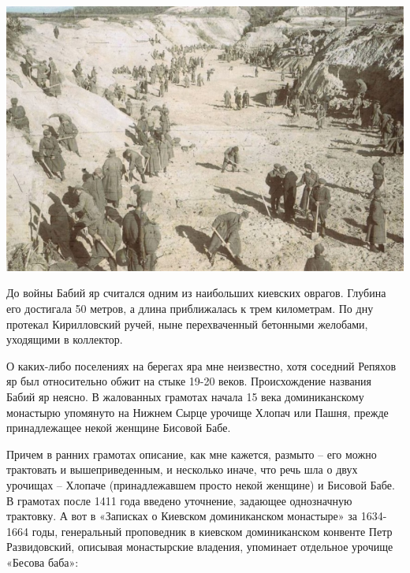 \begin{center}
\includegraphics[width=\linewidth]{chast-zmiy/kurilo/byar-02.jpg}
\end{center}

До войны Бабий яр считался одним из наибольших киевских оврагов. Глубина его достигала 50 метров, а длина приближалась к трем километрам. По дну протекал Кирилловский ручей, ныне перехваченный бетонными желобами, уходящими в коллектор.

О каких-либо поселениях на берегах яра мне неизвестно, хотя соседний Репяхов яр был относительно обжит на стыке 19-20 веков. Происхождение названия Бабий яр неясно. В жалованных грамотах начала 15 века\cite{sofiasobor01} доминиканскому монастырю упомянуто на Нижнем Сырце урочище Хлопач или Пашня, прежде принадлежащее некой женщине Бисовой Бабе.

Причем в ранних грамотах описание, как мне кажется, размыто – его можно трактовать и вышеприведенным, и несколько иначе, что речь шла о двух урочищах – Хлопаче (принадлежавшем просто некой женщине) и Бисовой Бабе. В грамотах после 1411 года введено уточнение, задающее однозначную трактовку. А вот в «Записках о Киевском доминиканском монастыре» за 1634-1664 годы, генеральный проповедник в киевском доминиканском конвенте Петр Развидовский, описывая монастырские владения, упоминает отдельное урочище «Бесова баба»\cite{sbornikmat}:



